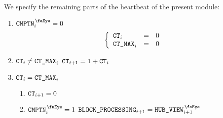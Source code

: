 We specify the remaining parts of the heartbeat of the present module:
\begin{enumerate}
	\item \If $\isUserTxnComputation _{i} = 0$ \Then
		\[
			\left\{ \begin{array}{lcl}
				\texttt{CT}    _{i    } & = & 0 \\
				\texttt{CT\_MAX} _{i    } & = & 0 \\
			\end{array} \right.
		\]
	\item \If $\texttt{CT} _{i} \neq \texttt{CT\_MAX} _{i}$ \Then $\texttt{CT} _{i + 1} = 1 + \texttt{CT} _{i}$
	\item \If $\texttt{CT} _{i} = \texttt{CT\_MAX} _{i}$ \Then
		\begin{enumerate}
			\item $\texttt{CT} _{i + 1} = 0$
			\item \If $\isUserTxnComputation _{i} = 1$ \Then $\blockProcessing  _{i + 1} = \isUserTxnHubView _{i + 1}$
		\end{enumerate}
\end{enumerate}
